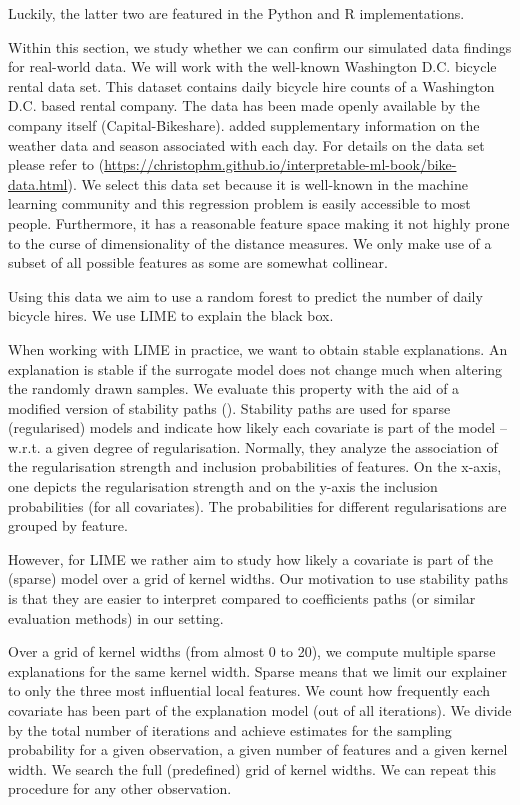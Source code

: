 \documentclass[]{krantz}
\begin{document}
Luckily, the latter two are featured in the Python and R
implementations.

Within this section, we study whether we can confirm our simulated data
findings for real-world data. We will work with the well-known
Washington D.C. bicycle rental data set. This dataset contains daily
bicycle hire counts of a Washington D.C. based rental company. The data
has been made openly available by the company itself
(Capital-Bikeshare). \citet{fanaee2014event} added supplementary
information on the weather data and season associated with each day. For
details on the data set please refer to \citet{molnar2019}
(\url{https://christophm.github.io/interpretable-ml-book/bike-data.html}).
We select this data set because it is well-known in the machine learning
community and this regression problem is easily accessible to most
people. Furthermore, it has a reasonable feature space making it not
highly prone to the curse of dimensionality of the distance measures. We
only make use of a subset of all possible features as some are somewhat
collinear.

Using this data we aim to use a random forest to predict the number of
daily bicycle hires. We use LIME to explain the black box.

When working with LIME in practice, we want to obtain stable
explanations. An explanation is stable if the surrogate model does not
change much when altering the randomly drawn samples. We evaluate this
property with the aid of a modified version of stability paths
(\citet{meinshausen2010stability}). Stability paths are used for sparse
(regularised) models and indicate how likely each covariate is part of
the model -- w.r.t. a given degree of regularisation. Normally, they
analyze the association of the regularisation strength and inclusion
probabilities of features. On the x-axis, one depicts the regularisation
strength and on the y-axis the inclusion probabilities (for all
covariates). The probabilities for different regularisations are grouped
by feature.

However, for LIME we rather aim to study how likely a covariate is part
of the (sparse) model over a grid of kernel widths. Our motivation to
use stability paths is that they are easier to interpret compared to
coefficients paths (or similar evaluation methods) in our setting.

Over a grid of kernel widths (from almost 0 to 20), we compute multiple
sparse explanations for the same kernel width. Sparse means that we
limit our explainer to only the three most influential local features.
We count how frequently each covariate has been part of the explanation
model (out of all iterations). We divide by the total number of
iterations and achieve estimates for the sampling probability for a
given observation, a given number of features and a given kernel width.
We search the full (predefined) grid of kernel widths. We can repeat
this procedure for any other observation.
\end{document}
